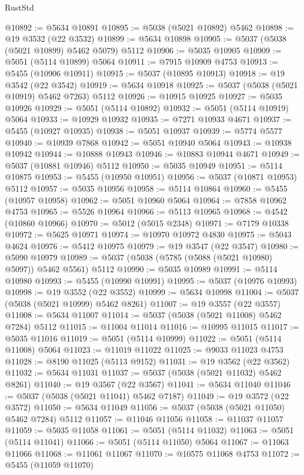 \begin{lexlean}{RustStd}
\begin{coremodule}
@10892 := @5634 @10891
@10895 := @5038 (@5021 @10892) @5462
@10898 := @19 @3532 (@22 @3532)
@10899 := @5634 @10898
@10905 := @5037 (@5038 (@5021 @10899) @5462 @5079) @5112
@10906 := @5035 @10905
@10909 := @5051 (@5114 @10899) @5064
@10911 := @7915 @10909 @4753
@10913 := @5455 (@10906 @10911)
@10915 := @5037 (@10895 @10913)
@10918 := @19 @3542 (@22 @3542)
@10919 := @5634 @10918
@10925 := @5037 (@5038 (@5021 @10919) @5462 @7263) @5112
@10926 := @10915 @10925
@10927 := @5035 @10926
@10929 := @5051 (@5114 @10892)
@10932 := @5051 (@5114 @10919) @5064
@10933 := @10929 @10932
@10935 := @7271 @10933 @4671
@10937 := @5455 (@10927 @10935)
@10938 := @5051 @10937
@10939 := @5774 @5577
@10940 := @10939 @7868
@10942 := @5051 @10940 @5064
@10943 := @10938 @10942
@10944 := @10888 @10943
@10946 := @10883 @10944 @4671
@10949 := @5037 (@10881 @10946) @5112
@10950 := @5035 @10949
@10951 := @5114 @10875
@10953 := @5455 (@10950 @10951)
@10956 := @5037 (@10871 @10953) @5112
@10957 := @5035 @10956
@10958 := @5114 @10864
@10960 := @5455 (@10957 @10958)
@10962 := @5051 @10960 @5064
@10964 := @7858 @10962 @4753
@10965 := @5526 @10964
@10966 := @5113 @10965
@10968 := @4542 (@10860 @10966)
@10970 := @5012 (@5015 @2348)
@10971 := @7179 @10338
@10972 := @5625 @10971
@10974 := @10970 @10972 @4830
@10975 := @5043 @4624
@10976 := @5412 @10975
@10979 := @19 @3547 (@22 @3547)
@10980 := @5090 @10979
@10989 := @5037 (@5038 (@5785 (@5088 (@5021 @10980) @5097)) @5462 @5561) @5112
@10990 := @5035 @10989
@10991 := @5114 @10980
@10993 := @5455 (@10990 @10991)
@10995 := @5037 (@10976 @10993)
@10998 := @19 @3552 (@22 @3552)
@10999 := @5634 @10998
@11004 := @5037 (@5038 (@5021 @10999) @5462 @8261)
@11007 := @19 @3557 (@22 @3557)
@11008 := @5634 @11007
@11014 := @5037 (@5038 (@5021 @11008) @5462 @7284) @5112
@11015 := @11004 @11014
@11016 := @10995 @11015
@11017 := @5035 @11016
@11019 := @5051 (@5114 @10999)
@11022 := @5051 (@5114 @11008) @5064
@11023 := @11019 @11022
@11025 := @9033 @11023 @4753
@11028 := @8190 @11025 (@5113 @9152)
@11031 := @19 @3562 (@22 @3562)
@11032 := @5634 @11031
@11037 := @5037 (@5038 (@5021 @11032) @5462 @8261)
@11040 := @19 @3567 (@22 @3567)
@11041 := @5634 @11040
@11046 := @5037 (@5038 (@5021 @11041) @5462 @7187)
@11049 := @19 @3572 (@22 @3572)
@11050 := @5634 @11049
@11056 := @5037 (@5038 (@5021 @11050) @5462 @7284) @5112
@11057 := @11046 @11056
@11058 := @11037 @11057
@11059 := @5035 @11058
@11061 := @5051 (@5114 @11032)
@11063 := @5051 (@5114 @11041)
@11066 := @5051 (@5114 @11050) @5064
@11067 := @11063 @11066
@11068 := @11061 @11067
@11070 := @10575 @11068 @4753
@11072 := @5455 (@11059 @11070)

\end{coremodule}
\end{lexlean}
